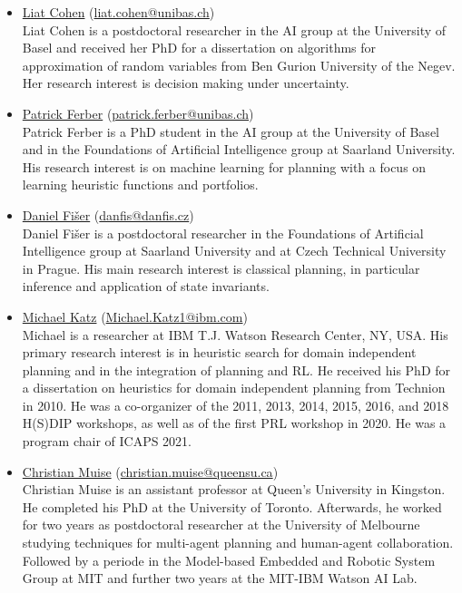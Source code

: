 \documentclass[10pt]{article}
\begin{document}
\newcommand{\organizer}[4]{\href{#2}{#1} (\href{mailto:#3}{#3})\\{#4}}
\begin{itemize}

\item \organizer{Liat Cohen}{https://ai.dmi.unibas.ch/people/cohen/index.html}{liat.cohen@unibas.ch}
{Liat Cohen is a postdoctoral researcher in the AI group at the
 University of Basel and received her PhD for a dissertation on 
 algorithms for approximation of random variables from Ben Gurion 
 University of the Negev. Her research interest is decision making 
 under uncertainty.}

\item \organizer{Patrick Ferber}{https://ai.dmi.unibas.ch/people/ferber/}{patrick.ferber@unibas.ch}
{Patrick Ferber is a PhD student in the AI group at the University of 
Basel and in the Foundations of Artificial Intelligence group at 
Saarland University. His research interest is on machine learning for 
planning with a focus on learning heuristic functions and portfolios.}

\item \organizer{Daniel Fi\v{s}er}{https://www.danfis.cz}{danfis@danfis.cz}
{Daniel Fi\v{s}er is a postdoctoral researcher
in the Foundations of Artificial Intelligence group at Saarland University
and at Czech Technical University in Prague.
His main research interest is classical planning, in particular inference and
application of state invariants.}

\item \organizer{Michael Katz}{https://researcher.watson.ibm.com/researcher/view.php?person=ibm-Michael.Katz1}{Michael.Katz1@ibm.com}
Michael is a researcher at IBM T.J. Watson Research Center, NY, USA. His
primary research interest is in heuristic search for domain independent
planning and in the integration of planning and RL. He received his PhD for a
dissertation on heuristics for domain independent planning from Technion in
2010. He was a co-organizer of the 2011, 2013, 2014, 2015, 2016, and 2018
H(S)DIP workshops, as well as of the first PRL workshop in 2020. He was a
program chair of ICAPS 2021.

\item \organizer{Christian Muise}{http://www.haz.ca/}{christian.muise@queensu.ca}
{Christian Muise is an assistant professor at Queen's University in
Kingston. He completed his PhD at the University of Toronto. Afterwards,
he worked for two years as postdoctoral researcher at the University of
Melbourne studying techniques for multi-agent planning and human-agent 
collaboration. Followed by a periode in the Model-based Embedded and Robotic
System Group at MIT and further two years at the MIT-IBM Watson AI Lab.}



\end{itemize}
\end{document}
